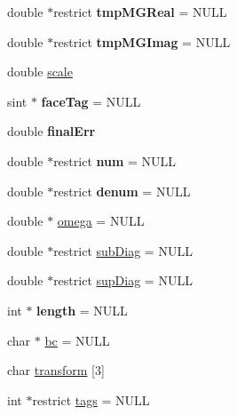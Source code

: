 \begin{DoxyCompactItemize}
\mbox{\label{classPencilDcmp_aaa7674c7a1f6fa3b5c4030538d3788a7}} 
double $\ast$restrict {\bfseries tmp\+M\+G\+Real} = N\+U\+LL
\item 
\mbox{\label{classPencilDcmp_a7b3364fedade9bec6d654aa370711a91}} 
double $\ast$restrict {\bfseries tmp\+M\+G\+Imag} = N\+U\+LL
\item 
double \mbox{\hyperlink{classPencilDcmp_a6f614285fa414f35f63d2c6277b39bc0}{scale}}
\item 
\mbox{\label{classPencilDcmp_a8190fed77d255603ac79831da77c3069}} 
sint $\ast$ {\bfseries face\+Tag} = N\+U\+LL
\item 
\mbox{\label{classPencilDcmp_a551ac372f59ddd81946dbaf83860f2ad}} 
double {\bfseries final\+Err}
\item 
\mbox{\label{classPencilDcmp_afd0847709755393cc1efbf4b7f3a792e}} 
double $\ast$restrict {\bfseries num} = N\+U\+LL
\item 
\mbox{\label{classPencilDcmp_acf0f013d3db5cabc878c3322d0a707e4}} 
double $\ast$restrict {\bfseries denum} = N\+U\+LL
\item 
double $\ast$ \mbox{\hyperlink{classPencilDcmp_a8b8e20d0f2241d0e9f16b55647f35cc6}{omega}} = N\+U\+LL
\item 
double $\ast$restrict \mbox{\hyperlink{classPencilDcmp_a551bc9ca5c23d551cf276c966d360399}{sub\+Diag}} = N\+U\+LL
\item 
double $\ast$restrict \mbox{\hyperlink{classPencilDcmp_a1207ba2d374b1a9bf6b899d661adac96}{sup\+Diag}} = N\+U\+LL
\item 
\mbox{\label{classPencilDcmp_a5b2d117b7d69d712338c8a8a2790761c}} 
int $\ast$ {\bfseries length} = N\+U\+LL
\item 
char $\ast$ \mbox{\hyperlink{classPencilDcmp_a8b5e6078c5689aeb6d5f79ae6c384260}{bc}} = N\+U\+LL
\item 
char \mbox{\hyperlink{classPencilDcmp_ab98fa8acc24281443f45521fd71de8d3}{transform}} \mbox{[}3\mbox{]}
\item 
int $\ast$restrict \mbox{\hyperlink{classPencilDcmp_ac6ad56d62e7f4d40db194b15fc7f3660}{tags}} = N\+U\+LL
\item 

\end{DoxyCompactItemize}
